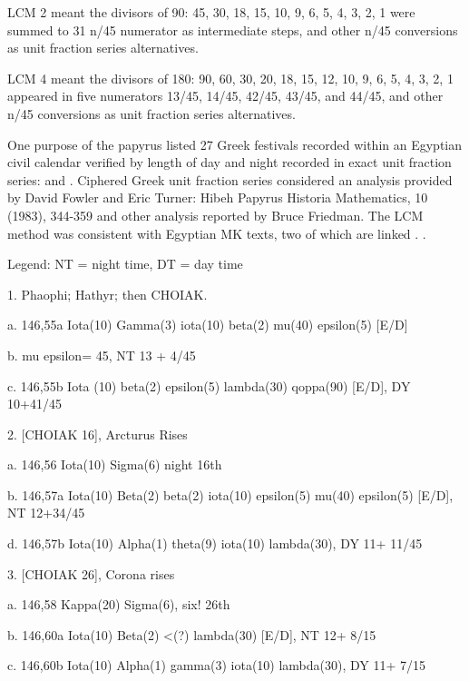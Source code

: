 \documentclass[12pt]{article}
\begin{document}
LCM 2 meant the divisors of 90: 45, 30, 18, 15, 10, 9, 6, 5, 4, 3, 2, 1 were summed to 31 n/45 numerator as intermediate steps, and other n/45 conversions as unit fraction series alternatives.

LCM 4 meant the divisors of 180: 90, 60, 30, 20, 18, 15, 12, 10, 9, 6, 5, 4, 3, 2, 1 appeared in five numerators 13/45, 14/45, 42/45, 43/45, and 44/45, and other n/45 conversions as unit fraction series alternatives.

One purpose of the papyrus listed 27 Greek festivals recorded within an Egyptian civil calendar verified by length of day and night recorded in exact unit fraction series:  and . Ciphered Greek unit fraction series considered an analysis provided by David Fowler and Eric Turner: Hibeh Papyrus Historia Mathematics, 10 (1983), 344-359 and other analysis reported by Bruce Friedman. The LCM method was consistent with Egyptian MK texts, two of which are linked . .

Legend: NT = night time, DT = day time

1. Phaophi; Hathyr; then CHOIAK.

a. 146,55a Iota(10) Gamma(3) iota(10) beta(2) mu(40) epsilon(5) [E/D]

b. mu epsilon= 45, NT 13 + 4/45

c. 146,55b Iota (10) beta(2) epsilon(5) lambda(30) qoppa(90) [E/D], DY 10+41/45 

2. [CHOIAK 16], Arcturus Rises

a. 146,56 Iota(10) Sigma(6) night 16th

b. 146,57a Iota(10) Beta(2) beta(2) iota(10) epsilon(5) mu(40) epsilon(5) [E/D], NT 12+34/45

d. 146,57b Iota(10) Alpha(1) theta(9) iota(10) lambda(30), DY 11+ 11/45

3. [CHOIAK 26], Corona rises

a. 146,58 Kappa(20) Sigma(6), six! 26th

b. 146,60a Iota(10) Beta(2) <(?) lambda(30) [E/D],  NT 12+ 8/15

c. 146,60b Iota(10) Alpha(1) gamma(3) iota(10) lambda(30),  DY 11+ 7/15
\end{document}
